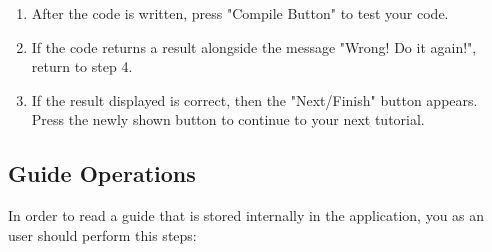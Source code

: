 \documentclass[12pt,a4paper,twoside]{report}
\begin{document}
\begin{enumerate}
\item After the code is written, press "Compile Button" to test your code.

\item If the code returns a result alongside the message "Wrong! Do it again!", return to step 4. 

\item If the result displayed is correct, then the "Next/Finish" button appears. Press the newly shown button to continue to your next tutorial.
\end{enumerate}
\subsection{Guide Operations}

In order to read a guide that is stored internally in the application, you as an user should perform this steps:
\end{document}

